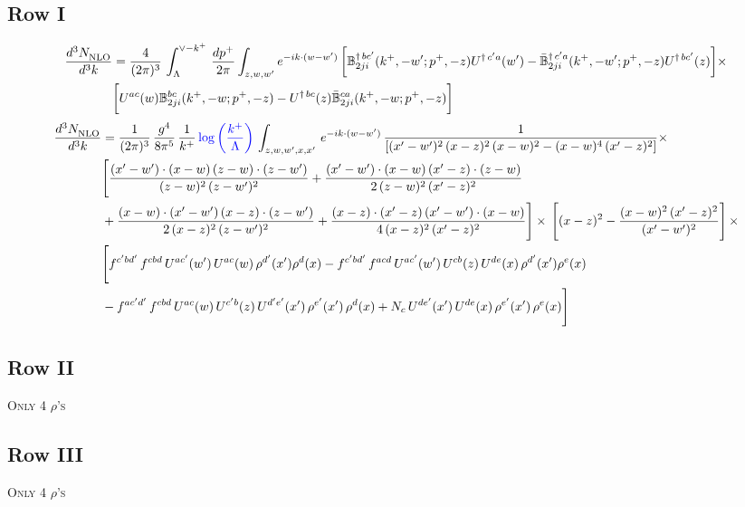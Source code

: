 \documentclass[9pt]{article}
\def\mf#1{\mathbb{#1}}
\numberwithin{equation}{section}
\begin{document}
\subsection{Row I}
\begin{align}
    \frac{d^{3}N_{\rm NLO}^{\rm}}{d^{3}k}  & = \frac{4}{(2\pi)^{3}}\,\int_{\Lambda}^{\vee-k^{+}}\, \frac{dp^{+}}{2\pi}\int_{z,w,w^{\prime}} e^{-ik\cdot (w-w')}\, \bigg[\mf{B}^{\dagger\, bc^{\prime}}_{2ji}(k^{+},-w^{\prime};p^{+},-z)U^{\dagger\,c^{\prime}a}(w^{\prime}) -\Bar{\mf{B}}^{\dagger\, c^{\prime}a}_{2ji}(k^{+},-w^{\prime}; p^{+},-z)U^{\dagger\,bc^{\prime}}(z)\bigg]\times\notag \\ & \bigg[U^{ac}(w) \mf{B}^{bc}_{2ji}(k^{+},-w;p^{+},-z) -U^{\dagger\, bc}(z)\Bar{\mf{B}}^{ca}_{2ji}(k^{+},-w; p^{+},-z)\bigg]\nonumber
\end{align}
\begin{align}
 \frac{d^{3}N_{\rm NLO}^{\rm}}{d^{3}k}  & =     \frac{1}{(2\pi)^{3}}\, \frac{g^{4}}{8\pi^{5}}\,\frac{1}{k^{+}}\,{\color{blue}\log{\left(\frac{k^{+}}{\Lambda}\right)}}\,\int_{z,w,w^{\prime},x,x'}\, e^{-ik\cdot (w-w')}\, \frac{1}{\left[(x'-w')^{2}\,(x-z)^{2}\,(x-w)^{2} - (x-w)^{4}\, (x'-z)^{2}\right]} \times\notag \\ & \Bigg[\frac{(x'-w')\cdot (x-w)\, (z-w)\cdot (z-w')}{(z-w)^{2}\, (z-w')^{2}}+\frac{(x'-w')\cdot (x-w)\, (x'-z)\cdot (z-w)}{2\, (z-w)^{2}\, (x'-z)^{2}}\notag \\ & +\frac{(x-w)\cdot (x'-w')\, (x-z)\cdot (z-w')}{2\, (x-z)^{2}\, (z-w')^{2}}+\frac{(x-z)\cdot (x'-z)\, (x'-w')\cdot (x-w)}{4\, (x-z)^{2}\, (x'-z)^{2}}\Bigg] \times\,\Bigg[(x-z)^{2} - \frac{(x-w)^{2}\, (x'-z)^{2}}{(x'-w')^{2}}\Bigg]\,\times \notag \\ & \Bigg[f^{c'bd'}\,f^{cbd}\, U^{ac'}(w')\,U^{ac}(w)\,\rho^{d'}(x')\rho^{d}(x)- f^{c'bd'}\,f^{acd}\,U^{ac'}(w')\,U^{cb}(z)\,U^{de}(x)\,\rho^{d'}(x')\rho^{e}(x) \notag \\ & -f^{ac'd'}\,f^{cbd}\,U^{ac}(w)\,U^{c'b}(z)\,U^{d'e'}(x')\,\rho^{e'}(x')\,\rho^{d}(x) +N_{c}\,U^{de'}(x')\,U^{de}(x)\,\rho^{e'}(x')\,\rho^{e}(x)\Bigg]
\end{align}
\subsection{Row II}
\textsc{Only 4 $\rho$'s}
\subsection{Row III}
\textsc{Only 4 $\rho$'s}
\end{document}
